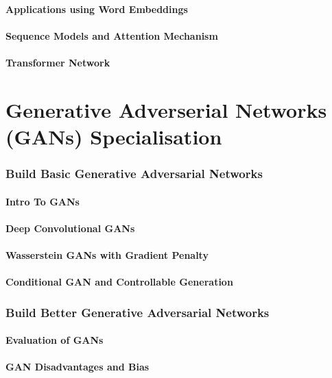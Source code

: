 \documentclass[a4paper, 11pt]{book}
\begin{document}
    \subsection{Applications using Word Embeddings}
    \subsection{Sequence Models and Attention Mechanism}
    \subsection{Transformer Network}


    \part{Generative Adverserial Networks (GANs) Specialisation}

    \section{Build Basic Generative Adversarial Networks}
    \subsection{Intro To GANs}
    \subsection{Deep Convolutional GANs}
    \subsection{Wasserstein GANs with Gradient Penalty}
    \subsection{Conditional GAN and Controllable Generation}

    \section{Build Better Generative Adversarial Networks}
    \subsection{Evaluation of GANs}
    \subsection{GAN Disadvantages and Bias}
\end{document}
